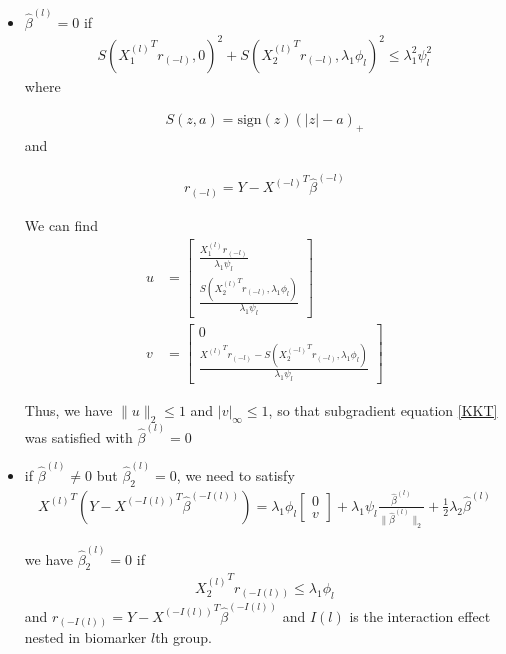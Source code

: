 \documentclass[12pt]{article}
\begin{document}
\begin{itemize}
\item $\hat{\beta}^{(l)}=0$ if 
\begin{equation} \label{zero}
  \begin{split}
S(  {X_1^{(l)}}^T  r_{(-l)},0)^2+S(  {X_2^{(l)} }^T  r_{(-l)},\lambda_1\phi_l)^2\leq \lambda_1^2\psi_l^2
\end{split}
\end{equation}
where 

\begin{align}
S(z,a)=\text{sign}(z)(|z|-a)_+
\end{align}
and 

\begin{align}
r_{(-l)}=Y- {X^{(-l)}}^T  \hat{\beta}^{(-l)}
\end{align}

We can find 
\begin{align}
  u & = \begin{bmatrix}
    \frac{X_1^{(l)}r_{(-l)}}{\lambda_1\psi_l} \\
    \frac{S(  {X_2^{(l)} }^T r_{(-l)},\lambda_1\phi_l)}{\lambda_1\psi_l}
  \end{bmatrix}
  \\
  v & = \begin{bmatrix}
    0 \\
    \frac{  {X^{(l)}}^T  r_{(-l)}-S( {X_2^{(-l)}}^T r_{(-l)},\lambda_1\phi_l)}{\lambda_1\psi_l}
  \end{bmatrix}
\end{align}

Thus, we have $\parallel u\parallel_2\leq 1$ and $|v|_{\infty}\leq 1$, so that subgradient equation \ref{KKT}
was satisfied with $\hat{\beta}^{(l)}=0$

\item if $\hat{\beta}^{(l)}\neq 0$ but $\hat{\beta}_2^{(l)} = 0 $, we need to satisfy 
\begin{align}
  {X^{(l)}}^T(Y- {X^{(-I(l))}}^T \hat{\beta}^{(-I(l))})=\lambda_1\phi_l \begin{bmatrix}
    0 \\
    v 
  \end{bmatrix}
  + \lambda_1\psi_l \frac{\hat{\beta}^{(l)}}{\parallel \hat{\beta}^{(l)} \parallel_2 } +\frac{1}{2}\lambda_2\hat{\beta}^{(l)}
\end{align}

we have $\hat{\beta}_2^{(l)}=0$ if
\begin{align}
 {X_2^{(l)}}^T r_{(-I(l))}\leq \lambda_1\phi_l  
\end{align}
and $r_{(-I(l))}=Y- {X^{(-I(l))}}^T \hat{\beta}^{(-I(l))}$ and $I(l)$ is the interaction effect
nested in biomarker $l$th group.



\end{itemize}
\end{document}
